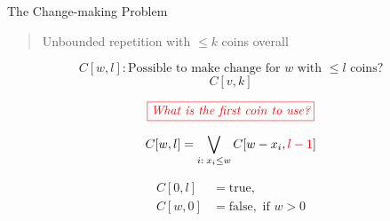 \begin{frame}{}
  \begin{exampleblock}{The Change-making Problem}
    \begin{quote}
      \centering
      Unbounded repetition with $\le k$ coins overall
    \end{quote}
  \end{exampleblock}

  \pause
  \[
    C[w,l]: \text{Possible to make change for $w$ with $\le l$ coins?}
  \]
  \[
    C[v,k]
  \]

  \pause
  \[
    \textcolor{red}{\fbox{\it What is the first coin to use?}}
  \]
 
  \pause
  \[
    C[w,l] = \bigvee_{i: \; x_i \le w} C[w-x_i, \textcolor{red}{l-1}]
  \]

  \pause
  \begin{align*}
    C[0,l] &= \text{true}, \\
    C[w,0] &= \text{false}, \text{ if } w > 0
  \end{align*}
\end{frame}
